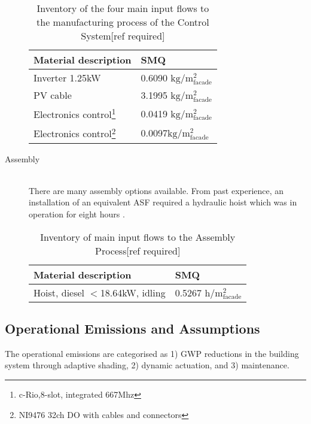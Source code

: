 \begin{description}
\begin{table}[H]
\centering
\begin{tabular}{ll}
\hline
Material description & SMQ \\ \hline
Inverter 1.25kW	 & 0.6090 ${\mathrm{kg/m^2_{facade}}}$ \\
PV cable  & 3.1995 ${\mathrm{kg/m^2_{facade}}}$\\
Electronics control\footnote{c-Rio,8-slot, integrated 667Mhz}& 0.0419 ${\mathrm{kg/m^2_{facade}}}$\\
Electronics control\footnote{NI9476 32ch DO with cables and connectors}& 0.0097${\mathrm{kg/m^2_{facade}}}$\\
\hline
\end{tabular}
\caption{Inventory of the four main input flows to the manufacturing process of the Control System[ref required]}
\label{tab:ControlInv}
\end{table}

\item[Assembly] \hfill \\
There are many assembly options available. From past experience, an installation of an equivalent ASF required a hydraulic hoist which was in operation for eight hours \cite{jayathissa2015abs}. \\

\begin{table}[H]
\centering
\begin{tabular}{ll}
\hline
Material description & SMQ \\ \hline
Hoist, diesel  ${<}$18.64kW, idling & 0.5267 ${\mathrm{h/m^2_{facade}}}$ \\
\hline
\end{tabular}
\caption{Inventory of main input flows to the Assembly Process[ref required]}
\label{tab:AssemblyInv}
\end{table}

\end{description}

\subsection{Operational Emissions and Assumptions}
\label{ch:Meth:Opp}

The operational emissions are categorised as 1) GWP reductions in the building system through adaptive shading, 2) dynamic actuation, and 3) maintenance.

